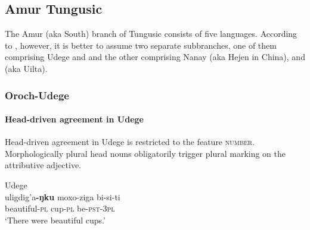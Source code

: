 \subsection{Amur Tungusic}
The Amur (aka South) branch of Tungusic consists of five languages. According to \citet[223]{salminen2007}, however, it is better to assume two separate subbranches, one of them comprising Udege and  and the other comprising Nanay (aka Hejen in China),  and  (aka Uilta).

\subsubsection{Oroch-Udege}
\paragraph*{Head\hyp{}driven agreement in Udege}
Head\hyp{}driven agreement in Udege is restricted to the feature \textsc{number}. Morphologically plural head nouns obligatorily trigger plural marking on the attributive adjective.
\begin{exe}
\ex 
\rm{Udege \citep[468]{nikolaeva-etal2001}}\\
\gll	uligdig'a\textbf{-ŋku} moxo-ziga bi-si-ti\\
	beautiful\textsc{-pl} cup\textsc{-pl} be\textsc{-pst-3pl}\\
\glt	‘There were beautiful cups.’
\end{exe}

